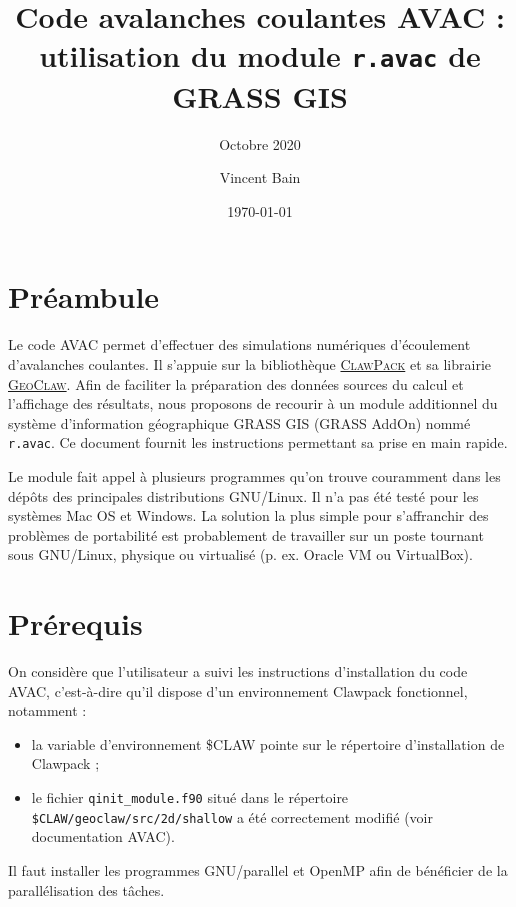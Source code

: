 \documentclass[12pt,oneside]{paper}
\newcommand{\bei}{\begin{itemize}}
\newcommand{\eit}{\end{itemize}}
\begin{document}
\pagestyle{fancy}
\title{Code avalanches coulantes AVAC : utilisation du module \texttt{r.avac} de GRASS GIS}
\subtitle{Octobre 2020}
\date{\today}
\author[1]{Vincent Bain}

\maketitle
\section{Préambule}

Le code AVAC permet d'effectuer des simulations numériques d'écoulement d'avalanches coulantes. Il s'appuie sur la bibliothèque \href{https://www.clawpack.org/}{\textsc{ClawPack}} et sa librairie \href{https://www.clawpack.org/geoclaw.html}{\textsc{GeoClaw}}. Afin de faciliter la préparation des données sources du calcul et l'affichage des résultats, nous proposons de recourir à un module additionnel du système d'information géographique GRASS GIS (GRASS AddOn) nommé \verb+r.avac+. Ce document fournit les instructions permettant sa prise en main rapide.

Le module fait appel à plusieurs programmes qu'on trouve couramment dans les dépôts des principales distributions GNU/Linux. Il n'a pas été testé pour les systèmes Mac OS et Windows. La solution la plus simple pour s'affranchir des problèmes de portabilité est probablement de travailler sur un poste tournant sous GNU/Linux, physique ou virtualisé (p. ex. Oracle VM ou  VirtualBox).

\section{Prérequis}

On considère que l'utilisateur a suivi les instructions d'installation du code AVAC, c'est-à-dire qu'il dispose d'un environnement Clawpack fonctionnel, notamment :
\bei
\item la variable d'environnement \$CLAW pointe sur le répertoire d'installation de Clawpack ;
\item le fichier \texttt{qinit\_module.f90} situé dans le répertoire \texttt{\$CLAW/geoclaw/src/2d/shallow} a été correctement modifié (voir documentation AVAC).
\eit

Il faut installer les programmes GNU/parallel et OpenMP afin de bénéficier de la parallélisation des tâches.
\end{document}
